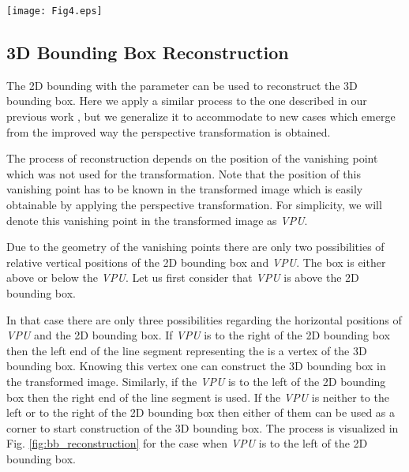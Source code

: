 \documentclass[twocolumn]{svjour3}          \smartqed  \usepackage{graphicx}
\begin{document}
\begin{figure*}[]
   \centering
   \texttt{[image: Fig4.eps]}
   \caption{The process of reconstructing the 3D bounding box (solid green) from the known 2D bounding box (dashed black), the line given by the  parameter (dotted blue) and the position of the \textit{VPU} (red cross). The process begins in the top left of the figure. Line segments originating in the \textit{VPU} (red dotted) are used when needed to determine the corners and edges of the 3D bounding box.}
   \label{fig:bb_reconstruction}
\end{figure*}


\subsection{3D Bounding Box Reconstruction}
\label{sec:VPU}

The 2D bounding with the  parameter can be used to reconstruct the 3D bounding box. Here we apply a similar process to the one described in our previous work \cite{CVWW2019}, but we generalize it to accommodate to new cases which emerge from the improved way the perspective transformation is obtained. 

The process of reconstruction depends on the position of the vanishing point which was not used for the transformation. Note that the position of this vanishing point has to be known in the transformed image which is easily obtainable by applying the perspective transformation. For simplicity, we will denote this vanishing point in the transformed image as \textit{VPU}. 

Due to the geometry of the vanishing points there are only two possibilities of relative vertical positions of the 2D bounding box and \textit{VPU}. The box is either above or below the \textit{VPU}. Let us first consider that \textit{VPU} is above the 2D bounding box. 

In that case there are only three possibilities regarding the horizontal positions of \textit{VPU} and the 2D bounding box. If \textit{VPU} is to the right of the 2D bounding box then the left end of the line segment representing the  is a vertex of the 3D bounding box. Knowing this vertex one can construct the 3D bounding box in the transformed image. Similarly, if the \textit{VPU} is to the left of the 2D bounding box then the right end of the line segment is used. If the \textit{VPU} is neither to the left or to the right of the 2D bounding box then either of them can be used as a corner to start construction of the 3D bounding box. The process is visualized in Fig. \ref{fig:bb_reconstruction} for the case when \textit{VPU} is to the left of the 2D bounding box.
\end{document}
